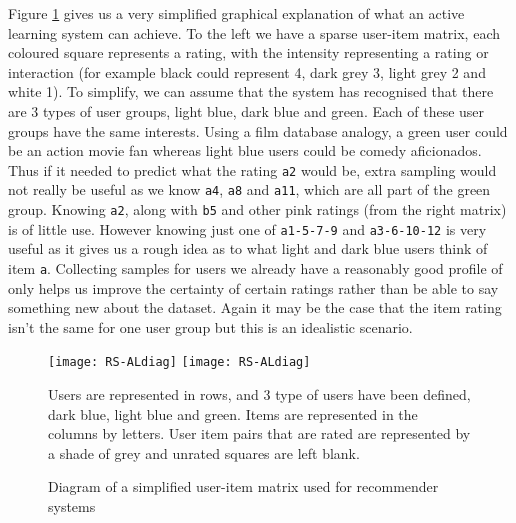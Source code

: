 Figure \ref{fig:al-diag} gives us a very simplified graphical explanation of what an active learning system can achieve. To the left we have a sparse user-item matrix, each coloured square represents a rating, with the intensity representing a rating or interaction (for example black could represent 4, dark grey 3, light grey 2 and white 1). To simplify, we can assume that the system has recognised that there are 3 types of user groups, light blue, dark blue and green. Each of these user groups have the same interests. Using a film database analogy, a green user could be an action movie fan whereas light blue users could be comedy aficionados. Thus if it needed to predict what the rating \texttt{a2} would be, extra sampling would not really be useful as we know \texttt{a4}, \texttt{a8} and \texttt{a11}, which are all part of the green group. Knowing \texttt{a2}, along with \texttt{b5} and other pink ratings (from the right matrix) is of little use. However knowing just one of \texttt{a1-5-7-9} and \texttt{a3-6-10-12} is very useful as it gives us a rough idea as to what light and dark blue users think of item \texttt{a}. Collecting samples for users we already have a reasonably good profile of only helps us improve the certainty of certain ratings rather than be able to say something new about the dataset. Again it may be the case that the item rating isn't the same for one user group but this is an idealistic scenario.
\begin{figure}[!htbp]
  \begin{center}
    \leavevmode
    \ifpdf
      \texttt{[image: RS-ALdiag]}
    \else
      \texttt{[image: RS-ALdiag]}
    \fi
    \end{center}
Users are represented in rows, and 3 type of users have been defined, dark blue, light blue and green. Items are represented in the columns by letters. User item pairs that are rated are represented by a shade of grey and unrated squares are left blank.
    \caption{Diagram of a simplified user-item matrix used for recommender systems}
    \label{fig:al-diag}
\end{figure}

